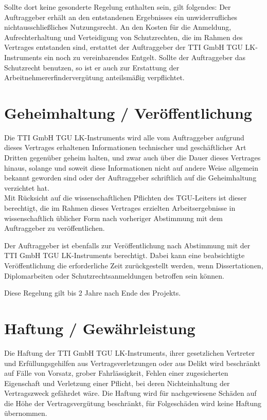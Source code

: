 \documentclass[a4paper, final, 11pt, oneside]{scrartcl}
\begin{document}
\begin{multicols}{2}
Sollte dort keine gesonderte Regelung enthalten sein, gilt folgendes: Der Auftraggeber erhält an den entstandenen Ergebnisses ein unwiderrufliches nichtausschließliches Nutzungsrecht. An den Kosten für die Anmeldung, Aufrechterhaltung und Verteidigung von Schutzrechten, die im Rahmen des Vertrages entstanden sind, erstattet der Auftraggeber der TTI GmbH TGU LK-Instruments ein noch zu vereinbarendes Entgelt. Sollte der Auftraggeber das Schutzrecht benutzen, so ist er auch zur Erstattung der Arbeitnehmererfindervergütung anteilsmäßig verpflichtet.

\section{Geheimhaltung / Veröffentlichung}
Die TTI GmbH TGU LK-Instruments wird alle vom Auftraggeber aufgrund dieses Vertrages erhaltenen Informationen technischer und geschäftlicher Art Dritten gegenüber geheim halten, und zwar auch über die Dauer dieses Vertrages hinaus, solange und soweit diese Informationen nicht auf andere Weise allgemein bekannt geworden sind oder der Auftraggeber schriftlich auf die Geheimhaltung verzichtet hat.\\
Mit Rücksicht auf die wissenschaftlichen Pflichten des TGU-Leiters ist dieser berechtigt, die im Rahmen dieses Vertrages erzielten Arbeitsergebnisse in wissenschaftlich üblicher Form nach vorheriger Abstimmung mit dem Auftraggeber zu veröffentlichen.

Der Auftraggeber ist ebenfalls zur Veröffentlichung nach Abstimmung mit der TTI GmbH TGU LK-Instruments berechtigt. Dabei kann eine beabsichtigte Veröffentlichung die erforderliche Zeit zurückgestellt werden, wenn Dissertationen, Diplomarbeiten oder Schutzrechtsanmeldungen betroffen sein können.

Diese Regelung gilt bis 2 Jahre nach Ende des Projekts.

\section{Haftung / Gewährleistung}
Die Haftung der TTI GmbH TGU LK-Instruments, ihrer gesetzlichen Vertreter und Erfüllungsgehilfen aus Vertragsverletzungen oder aus Delikt wird beschränkt auf Fälle von Vorsatz, grober Fahrlässigkeit, Fehlen einer zugesicherten Eigenschaft und Verletzung einer Pflicht, bei deren Nichteinhaltung der Vertragszweck gefährdet wäre. Die Haftung wird für nachgewiesene Schäden auf die Höhe der Vertragsvergütung beschränkt, für Folgeschäden wird keine Haftung übernommen.


\end{multicols}
\end{document}
